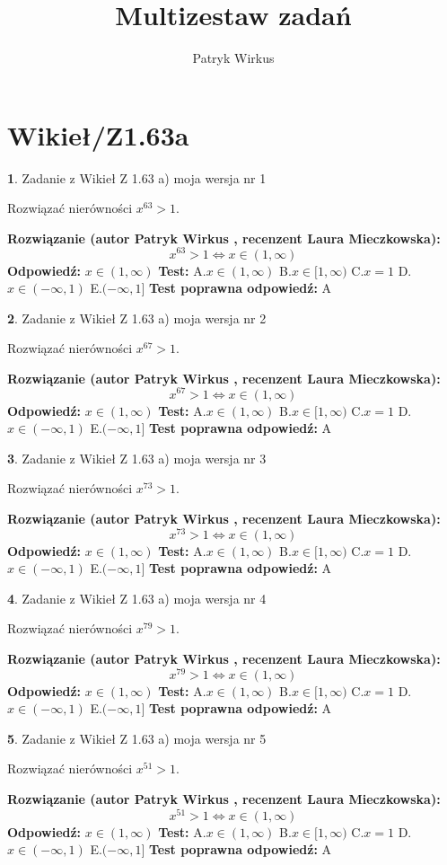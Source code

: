 \documentclass[12pt, a4paper]{article}
\title{Multizestaw zadań}
\author{Patryk Wirkus}
\date{}
\theoremstyle{definition} %
\newtheorem{zad}{}
\newcommand{\kategoria}[1]{\section{#1}}
\newcommand{\zadStart}[1]{\begin{zad}#1\newline}
\newcommand{\zadStop}{\end{zad}}
\newcommand{\rozwStart}[2]{\noindent \textbf{Rozwiązanie (autor #1 , recenzent #2): }\newline}
\newcommand{\rozwStop}{\newline}
\newcommand{\odpStart}{\noindent \textbf{Odpowiedź:}\newline}
\newcommand{\odpStop}{\newline}
\newcommand{\testStart}{\noindent \textbf{Test:}\newline}
\newcommand{\testStop}{\newline}
\newcommand{\kluczStart}{\noindent \textbf{Test poprawna odpowiedź:}\newline}
\newcommand{\kluczStop}{\newline}
\begin{document}
\maketitle

\kategoria{Wikieł/Z1.63a}


\zadStart{Zadanie z Wikieł Z 1.63 a) moja wersja nr 1}

Rozwiązać nierówności $x^{63} > 1$.
\zadStop
\rozwStart{Patryk Wirkus}{Laura Mieczkowska}
$$x^{63} > 1 \iff x \in (1,\infty)$$
\rozwStop
\odpStart
$x \in (1,\infty)$
\odpStop
\testStart
A.$x \in (1,\infty)$ B.$x \in [1,\infty)$ C.$x = 1$ D.$x \in (-\infty,1)$ E.$(-\infty,1]$
\testStop
\kluczStart
A
\kluczStop



\zadStart{Zadanie z Wikieł Z 1.63 a) moja wersja nr 2}

Rozwiązać nierówności $x^{67} > 1$.
\zadStop
\rozwStart{Patryk Wirkus}{Laura Mieczkowska}
$$x^{67} > 1 \iff x \in (1,\infty)$$
\rozwStop
\odpStart
$x \in (1,\infty)$
\odpStop
\testStart
A.$x \in (1,\infty)$ B.$x \in [1,\infty)$ C.$x = 1$ D.$x \in (-\infty,1)$ E.$(-\infty,1]$
\testStop
\kluczStart
A
\kluczStop



\zadStart{Zadanie z Wikieł Z 1.63 a) moja wersja nr 3}

Rozwiązać nierówności $x^{73} > 1$.
\zadStop
\rozwStart{Patryk Wirkus}{Laura Mieczkowska}
$$x^{73} > 1 \iff x \in (1,\infty)$$
\rozwStop
\odpStart
$x \in (1,\infty)$
\odpStop
\testStart
A.$x \in (1,\infty)$ B.$x \in [1,\infty)$ C.$x = 1$ D.$x \in (-\infty,1)$ E.$(-\infty,1]$
\testStop
\kluczStart
A
\kluczStop



\zadStart{Zadanie z Wikieł Z 1.63 a) moja wersja nr 4}

Rozwiązać nierówności $x^{79} > 1$.
\zadStop
\rozwStart{Patryk Wirkus}{Laura Mieczkowska}
$$x^{79} > 1 \iff x \in (1,\infty)$$
\rozwStop
\odpStart
$x \in (1,\infty)$
\odpStop
\testStart
A.$x \in (1,\infty)$ B.$x \in [1,\infty)$ C.$x = 1$ D.$x \in (-\infty,1)$ E.$(-\infty,1]$
\testStop
\kluczStart
A
\kluczStop



\zadStart{Zadanie z Wikieł Z 1.63 a) moja wersja nr 5}

Rozwiązać nierówności $x^{51} > 1$.
\zadStop
\rozwStart{Patryk Wirkus}{Laura Mieczkowska}
$$x^{51} > 1 \iff x \in (1,\infty)$$
\rozwStop
\odpStart
$x \in (1,\infty)$
\odpStop
\testStart
A.$x \in (1,\infty)$ B.$x \in [1,\infty)$ C.$x = 1$ D.$x \in (-\infty,1)$ E.$(-\infty,1]$
\testStop
\kluczStart
A
\kluczStop
\end{document}
